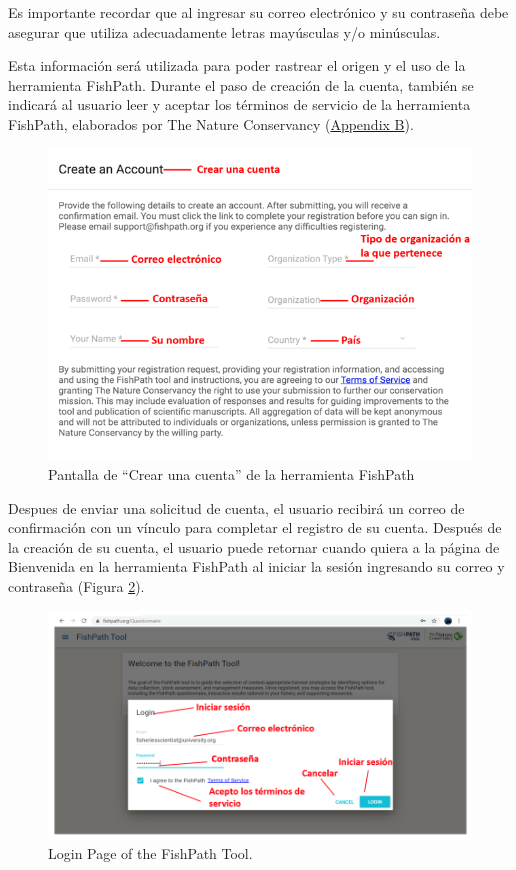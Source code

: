 \documentclass[
  11pt,
]{book}
\begin{document}
Es importante recordar que al ingresar su correo electrónico y su contraseña debe asegurar que utiliza adecuadamente letras mayúsculas y/o minúsculas.

Esta información será utilizada para poder rastrear el origen y el uso de la herramienta FishPath. Durante el paso de creación de la cuenta, también se indicará al usuario leer y aceptar los términos de servicio de la herramienta FishPath, elaborados por The Nature Conservancy (\protect\hyperlink{terms}{Appendix B}).

\begin{figure}

{\centering \includegraphics[width=0.95\linewidth]{images/create-account-es} 

}

\caption{Pantalla de “Crear una cuenta” de la herramienta FishPath}\label{fig:create-account}
\end{figure}

Despues de enviar una solicitud de cuenta, el usuario recibirá un correo de confirmación con un vínculo para completar el registro de su cuenta. Después de la creación de su cuenta, el usuario puede retornar cuando quiera a la página de Bienvenida en la herramienta FishPath al iniciar la sesión ingresando su correo y contraseña (Figura \ref{fig:login-page}).

\begin{figure}

{\centering \includegraphics[width=0.95\linewidth]{images/login-page-es} 

}

\caption{Login Page of the FishPath Tool.}\label{fig:login-page}
\end{figure}
\end{document}
